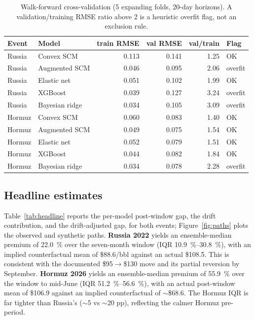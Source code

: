 \documentclass[11pt,a4paper]{article}
\begin{document}
\begin{table}[h]
\centering
\caption{Walk-forward cross-validation (5 expanding folds, 20-day horizons). A
validation/training RMSE ratio above 2 is a heuristic overfit flag, not an exclusion rule.}
\label{tab:wfcv}
\small
\begin{tabular}{@{}llrrrl@{}}
\toprule
Event & Model & train RMSE & val RMSE & val/train & Flag \\
\midrule
Russia & Convex SCM     & 0.113 & 0.141 & 1.25 & OK \\
Russia & Augmented SCM  & 0.046 & 0.095 & 2.06 & overfit \\
Russia & Elastic net    & 0.051 & 0.102 & 1.99 & OK \\
Russia & XGBoost        & 0.039 & 0.127 & 3.24 & overfit \\
Russia & Bayesian ridge & 0.034 & 0.105 & 3.09 & overfit \\
\addlinespace
Hormuz & Convex SCM     & 0.060 & 0.083 & 1.40 & OK \\
Hormuz & Augmented SCM  & 0.049 & 0.075 & 1.54 & OK \\
Hormuz & Elastic net    & 0.052 & 0.079 & 1.51 & OK \\
Hormuz & XGBoost        & 0.044 & 0.082 & 1.84 & OK \\
Hormuz & Bayesian ridge & 0.034 & 0.078 & 2.28 & overfit \\
\bottomrule
\end{tabular}
\end{table}

\subsection{Headline estimates}
Table~\ref{tab:headline} reports the per-model post-window gap, the drift contribution,
and the drift-adjusted gap, for both events; Figure~\ref{fig:paths} plots the observed
and synthetic paths. \textbf{Russia 2022} yields an ensemble-median premium of
\SI{22.0}{\percent} over the seven-month window (IQR \SIrange{10.9}{30.8}{\percent}),
with an implied counterfactual mean of \$88.6/bbl against an actual \$108.5. This is
consistent with the documented \$95$\to$\$130 move and its partial reversion by
September. \textbf{Hormuz 2026} yields an ensemble-median premium of
\SI{55.9}{\percent} over the window to mid-June (IQR \SIrange{51.2}{56.6}{\percent}),
with an actual post-window mean of \$106.9 against an implied counterfactual of
$\sim$\$68.6. The Hormuz IQR is far tighter than Russia's ($\sim$5 vs $\sim$20 pp),
reflecting the calmer Hormuz pre-period.
\end{document}
